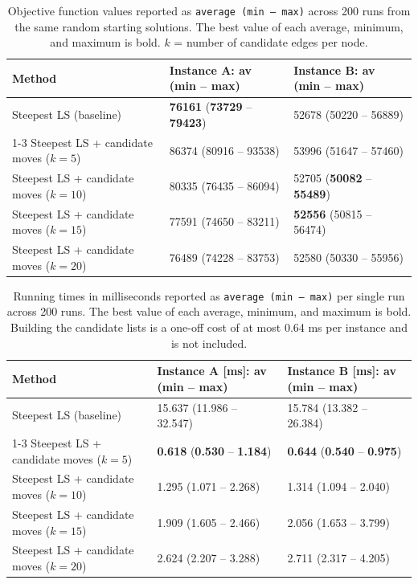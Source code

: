 \begin{table}[h!]
\centering
\footnotesize
\setlength{\tabcolsep}{3pt}
\renewcommand{\arraystretch}{1.5}
\caption{Objective function values reported as \texttt{average (min -- max)} across 200 runs from the same random starting solutions. The best value of each average, minimum, and maximum is bold. $k$ = number of candidate edges per node.}
\label{tab:task4_obj}
\vspace{0.5em}
\begin{tabularx}{\textwidth}{p{7.2cm} X X}
\toprule
\textbf{Method} & \textbf{Instance A: av (min -- max)} & \textbf{Instance B: av (min -- max)} \\
\midrule
Steepest LS (baseline) & \textbf{76161} (\textbf{73729} -- \textbf{79423}) & 52678 (50220 -- 56889) \\
\cmidrule{1-3}
Steepest LS + candidate moves ($k = 5$) & 86374 (80916 -- 93538) & 53996 (51647 -- 57460) \\
Steepest LS + candidate moves ($k = 10$) & 80335 (76435 -- 86094) & 52705 (\textbf{50082} -- \textbf{55489}) \\
Steepest LS + candidate moves ($k = 15$) & 77591 (74650 -- 83211) & \textbf{52556} (50815 -- 56474) \\
Steepest LS + candidate moves ($k = 20$) & 76489 (74228 -- 83753) & 52580 (50330 -- 55956) \\
\bottomrule
\end{tabularx}
\end{table}

\begin{table}[h!]
\centering
\footnotesize
\setlength{\tabcolsep}{3pt}
\renewcommand{\arraystretch}{1.5}
\caption{Running times in milliseconds reported as \texttt{average (min -- max)} per single run across 200 runs. The best value of each average, minimum, and maximum is bold. Building the candidate lists is a one-off cost of at most 0.64 ms per instance and is not included.}
\label{tab:task4_time}
\vspace{0.5em}
\begin{tabularx}{\textwidth}{p{7.2cm} X X}
\toprule
\textbf{Method} & \textbf{Instance A [ms]: av (min -- max)} & \textbf{Instance B [ms]: av (min -- max)} \\
\midrule
Steepest LS (baseline) & 15.637 (11.986 -- 32.547) & 15.784 (13.382 -- 26.384) \\
\cmidrule{1-3}
Steepest LS + candidate moves ($k = 5$) & \textbf{0.618} (\textbf{0.530} -- \textbf{1.184}) & \textbf{0.644} (\textbf{0.540} -- \textbf{0.975}) \\
Steepest LS + candidate moves ($k = 10$) & 1.295 (1.071 -- 2.268) & 1.314 (1.094 -- 2.040) \\
Steepest LS + candidate moves ($k = 15$) & 1.909 (1.605 -- 2.466) & 2.056 (1.653 -- 3.799) \\
Steepest LS + candidate moves ($k = 20$) & 2.624 (2.207 -- 3.288) & 2.711 (2.317 -- 4.205) \\
\bottomrule
\end{tabularx}
\end{table}

